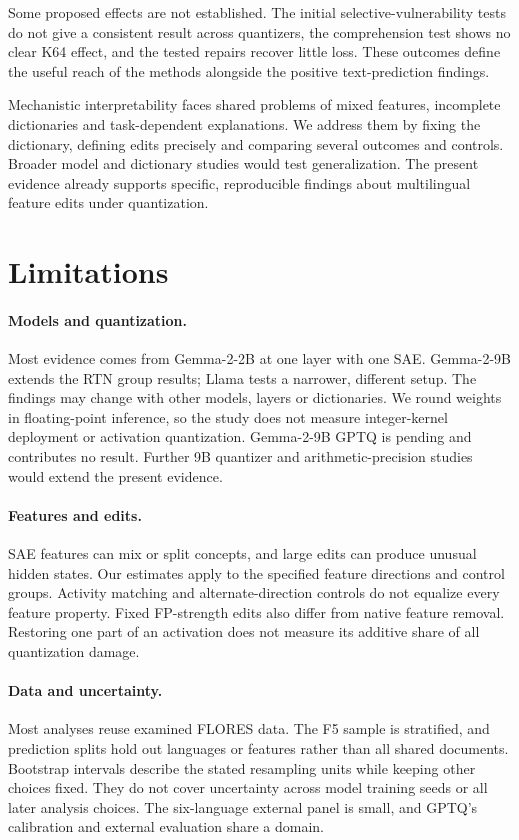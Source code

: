 \documentclass[11pt]{article}
\begin{document}
Some proposed effects are not established. The initial selective-vulnerability tests do not give a consistent result across quantizers, the comprehension test shows no clear K64 effect, and the tested repairs recover little loss. These outcomes define the useful reach of the methods alongside the positive text-prediction findings.

Mechanistic interpretability faces shared problems of mixed features, incomplete dictionaries and task-dependent explanations. We address them by fixing the dictionary, defining edits precisely and comparing several outcomes and controls. Broader model and dictionary studies would test generalization. The present evidence already supports specific, reproducible findings about multilingual feature edits under quantization.

\section*{Limitations}
\paragraph{Models and quantization.}
Most evidence comes from Gemma-2-2B at one layer with one SAE. Gemma-2-9B extends the RTN group results; Llama tests a narrower, different setup. The findings may change with other models, layers or dictionaries. We round weights in floating-point inference, so the study does not measure integer-kernel deployment or activation quantization. Gemma-2-9B GPTQ is pending and contributes no result. Further 9B quantizer and arithmetic-precision studies would extend the present evidence.

\paragraph{Features and edits.}
SAE features can mix or split concepts, and large edits can produce unusual hidden states. Our estimates apply to the specified feature directions and control groups. Activity matching and alternate-direction controls do not equalize every feature property. Fixed FP-strength edits also differ from native feature removal. Restoring one part of an activation does not measure its additive share of all quantization damage.

\paragraph{Data and uncertainty.}
Most analyses reuse examined FLORES data. The F5 sample is stratified, and prediction splits hold out languages or features rather than all shared documents. Bootstrap intervals describe the stated resampling units while keeping other choices fixed. They do not cover uncertainty across model training seeds or all later analysis choices. The six-language external panel is small, and GPTQ's calibration and external evaluation share a domain.
\end{document}

